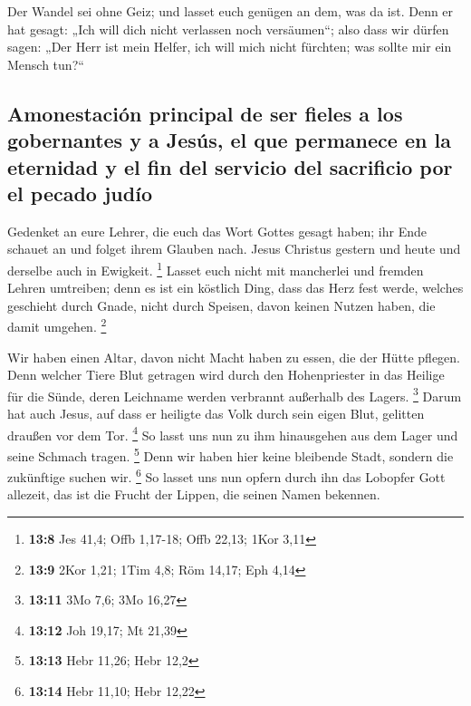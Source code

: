  Der Wandel sei ohne Geiz; und lasset euch genügen an dem,
was da ist. Denn er hat gesagt: „Ich will dich nicht verlassen noch
versäumen``;  also dass wir dürfen sagen: „Der Herr ist
mein Helfer, ich will mich nicht fürchten; was sollte mir ein Mensch
tun?{}``

\hypertarget{amonestaciuxf3n-principal-de-ser-fieles-a-los-gobernantes-y-a-jesuxfas-el-que-permanece-en-la-eternidad-y-el-fin-del-servicio-del-sacrificio-por-el-pecado-juduxedo}{%
\subsection{Amonestación principal de ser fieles a los gobernantes y a
Jesús, el que permanece en la eternidad y el fin del servicio del
sacrificio por el pecado
judío}\label{amonestaciuxf3n-principal-de-ser-fieles-a-los-gobernantes-y-a-jesuxfas-el-que-permanece-en-la-eternidad-y-el-fin-del-servicio-del-sacrificio-por-el-pecado-juduxedo}}

 Gedenket an eure Lehrer, die euch das Wort Gottes gesagt
haben; ihr Ende schauet an und folget ihrem Glauben nach. 
Jesus Christus gestern und heute und derselbe auch in Ewigkeit.
\footnote{\textbf{13:8} Jes 41,4; Offb 1,17-18; Offb 22,13; 1Kor 3,11}
 Lasset euch nicht mit mancherlei und fremden Lehren
umtreiben; denn es ist ein köstlich Ding, dass das Herz fest werde,
welches geschieht durch Gnade, nicht durch Speisen, davon keinen Nutzen
haben, die damit umgehen. \footnote{\textbf{13:9} 2Kor 1,21; 1Tim 4,8;
  Röm 14,17; Eph 4,14}

 Wir haben einen Altar, davon nicht Macht haben zu essen,
die der Hütte pflegen.  Denn welcher Tiere Blut getragen
wird durch den Hohenpriester in das Heilige für die Sünde, deren
Leichname werden verbrannt außerhalb des Lagers. \footnote{\textbf{13:11}
  3Mo 7,6; 3Mo 16,27}  Darum hat auch Jesus, auf dass er
heiligte das Volk durch sein eigen Blut, gelitten draußen vor dem Tor.
\footnote{\textbf{13:12} Joh 19,17; Mt 21,39}  So lasst
uns nun zu ihm hinausgehen aus dem Lager und seine Schmach tragen.
\footnote{\textbf{13:13} Hebr 11,26; Hebr 12,2}  Denn wir
haben hier keine bleibende Stadt, sondern die zukünftige suchen wir.
\footnote{\textbf{13:14} Hebr 11,10; Hebr 12,22}  So
lasset uns nun opfern durch ihn das Lobopfer Gott allezeit, das ist die
Frucht der Lippen, die seinen Namen bekennen.

